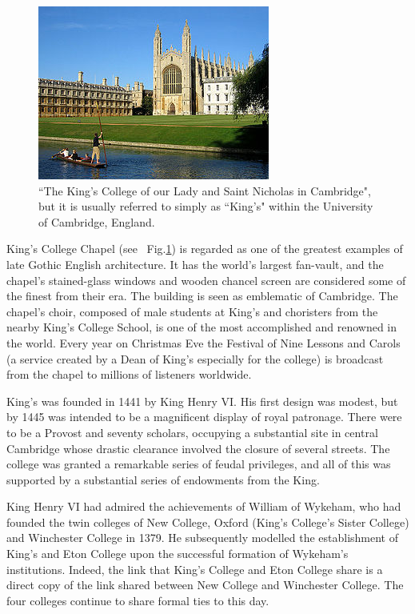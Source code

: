 \documentclass{report}
\begin{document}
\begin{figure} %
\centering    %
\includegraphics[scale=1.0]{Pictures/Kings.jpg}
\caption[King's College Cambridge]{``The King's College of our Lady and Saint Nicholas in Cambridge", but it is usually referred to simply as ``King's" within the University of Cambridge, England.}
\label{fig:Kings}
\end{figure}


King's College Chapel (see ~Fig.\ref{fig:Kings}) is regarded as one of the greatest examples of late Gothic English architecture. It has the world's largest fan-vault, and the chapel's stained-glass windows and wooden chancel screen are considered some of the finest from their era. The building is seen as emblematic of Cambridge. The chapel's choir, composed of male students at King's and choristers from the nearby King's College School, is one of the most accomplished and renowned in the world. Every year on Christmas Eve the Festival of Nine Lessons and Carols (a service created by a Dean of King's especially for the college) is broadcast from the chapel to millions of listeners worldwide.

King's was founded in 1441 by King Henry VI. His first design was modest, but by 1445 was intended to be a magnificent display of royal patronage. There were to be a Provost and seventy scholars, occupying a substantial site in central Cambridge whose drastic clearance involved the closure of several streets. The college was granted a remarkable series of feudal privileges, and all of this was supported by a substantial series of endowments from the King.

King Henry VI had admired the achievements of William of Wykeham, who had founded the twin colleges of New College, Oxford (King's College's Sister College) and Winchester College in 1379. He subsequently modelled the establishment of King's and Eton College upon the successful formation of Wykeham's institutions. Indeed, the link that King's College and Eton College share is a direct copy of the link shared between New College and Winchester College. The four colleges continue to share formal ties to this day.
\end{document}
